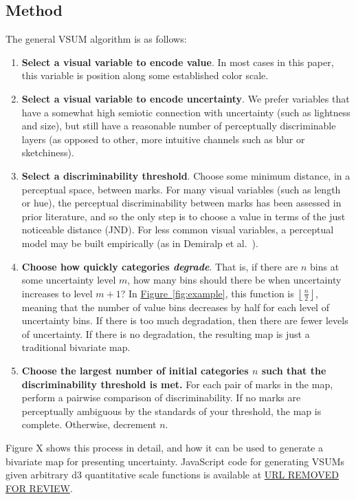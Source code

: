 \documentclass{vgtc}                          %
\newcommand{\figref}[1]{\hyperref[#1]{Figure~\ref*{#1}}}
\begin{document}
\subsection{Method}

The general VSUM algorithm is as follows:

\begin{enumerate}
	\item \textbf{Select a visual variable to encode value}. In most cases in this paper, this variable is position along some established color scale.
	\item \textbf{Select a visual variable to encode uncertainty}. We prefer variables that have a somewhat high semiotic connection with uncertainty (such as lightness and size), but still have a reasonable number of perceptually discriminable layers (as opposed to other, more intuitive channels such as blur or sketchiness).
	\item \textbf{Select a discriminability threshold}. Choose some minimum distance, in a perceptual space, between marks. For many visual variables (such as length or hue), the perceptual discriminability between marks has been assessed in prior literature, and so the only step is to choose a value in terms of the just noticeable distance (JND). For less common visual variables, a perceptual model may be built empirically (as in Demiralp et al.~\cite{demiralp2014learning}).
	\item \textbf{Choose how quickly categories \emph{degrade}}. That is, if there are $n$ bins at some uncertainty level $m$, how many bins should there be when uncertainty increases to level $m+1$? In \figref{fig:example}, this function is $\left \lfloor {\frac{n}{2}}\right \rfloor$, meaning that the number of value bins decreases by half for each level of uncertainty bins. If there is too much degradation, then there are fewer levels of uncertainty. If there is no degradation, the resulting map is just a traditional bivariate map.
	\item \textbf{Choose the largest number of initial categories $n$ such that the discriminability threshold is met.} For each pair of marks in the map, perform a pairwise comparison of discriminability. If no marks are perceptually ambiguous by the standards of your threshold, the map is complete. Otherwise, decrement $n$.
\end{enumerate}

Figure X shows this process in detail, and how it can be used to generate a bivariate map for presenting uncertainty. JavaScript code for generating VSUMs given arbitrary d3 quantitative scale functions is available at \url{URL REMOVED FOR REVIEW}.
\end{document}
